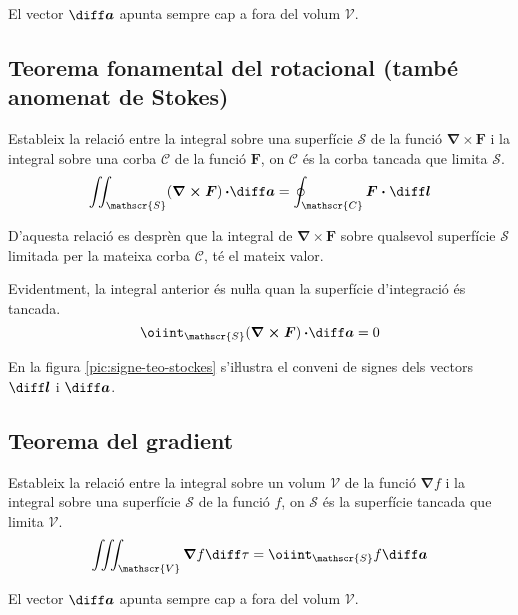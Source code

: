 \documentclass[catalan,a4paper,twoside,11pt]{article}
\begin{document}
El vector $\boldsymbol{\diff a}$ apunta sempre cap a fora del volum $\mathscr{V}$.

\subsection{Teorema fonamental del rotacional (també anomenat de Stokes)}
Estableix la relació entre la integral sobre una superfície $\mathscr{S}$ de la funció $\boldsymbol{\nabla\times F}$ i la integral sobre una corba $\mathscr{C}$ de la funció $\boldsymbol{F}$, on $\mathscr{C}$ és la corba tancada que limita $\mathscr{S}$.
\begin{equation}
    \iint_\mathscr{S}(\boldsymbol{\nabla\times F})\boldsymbol{\,\cdot\diff a} =
    \oint_\mathscr{C}\boldsymbol{F\cdot\diff l}
\end{equation}

D'aquesta relació es desprèn que la integral de $\boldsymbol{\nabla\times F}$ sobre qualsevol superfície $\mathscr{S}$ limitada per la mateixa corba $\mathscr{C}$, té el mateix valor.

Evidentment, la integral anterior és nuŀla quan la superfície d'integració és tancada.
\begin{equation}
    \oiint_\mathscr{S}(\boldsymbol{\nabla\times F})\boldsymbol{\,\cdot\diff a} = 0
\end{equation}

En la figura \vref{pic:signe-teo-stockes} s'iŀlustra el conveni de
signes dels vectors $\boldsymbol{\diff l}$ i $\boldsymbol{\diff a}$.

\begin{center}
	
	\label{pic:signe-teo-stockes}
\end{center}


\subsection{Teorema del gradient}
Estableix la relació entre la integral sobre un volum $\mathscr{V}$ de la funció $\boldsymbol{\nabla}f$ i la integral sobre una superfície $\mathscr{S}$ de la funció $f$, on $\mathscr{S}$ és la superfície tancada que limita $\mathscr{V}$.
\begin{equation}
    \iiint_\mathscr{V}\boldsymbol{\nabla}f \diff \tau = \oiint_\mathscr{S} f\boldsymbol{\diff a}
\end{equation}

El vector $\boldsymbol{\diff a}$ apunta sempre cap a fora del volum $\mathscr{V}$.
\end{document}
